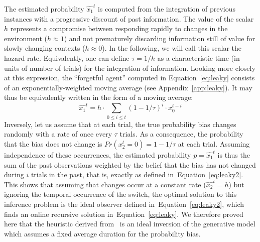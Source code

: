 \documentclass[12pt,english]{article}%
\newcommand{\eql}[1]{\begin{equation}#1\end{equation}}
\newcommand{\citet}[1]{\textcite{#1}}
\newcommand{\seeEq}[1]{Equation~\ref{eq:#1}}
\newcommand{\seeApp}[1]{Appendix~\ref{app:#1}}
\newcommand{\LP}[1]{\textbf{\textcolor{red}{[LP: #1]}}}
\newcommand{\AM}[1]{\textbf{\textcolor{blue}{[AM: #1]}}}
\begin{document}
The estimated probability $\hat{x_1}^{t}$ is computed
from the integration of previous instances
with a progressive discount of past information.
The value of the scalar $h$ represents
a compromise between responding rapidly
to changes in the environment ($h \approx 1$) and
not prematurely discarding information still of value
for slowly changing contexts  ($h \approx 0$).
In the following, we will call this scalar the hazard rate.
Equivalently, one can define $\tau = 1 / h$ as
a characteristic time (in units of number of trials)
for the integration of information.
Looking more closely at this expression,
the ``forgetful agent'' computed in \seeEq{leaky}
consists of an exponentially-weighted moving average (see \seeApp{leaky}).
It may thus be equivalently written in the form of a moving average:
\eql{
\hat{x_1}^{t} = h \cdot \sum_{0\leq i \leq t} (1 - 1/\tau)^{i} \cdot x_0^{t-i}
\label{eq:leaky2}}
Inversely, let us assume that at each trial,
the true probability bias changes randomly with a rate of once
every $\tau$ trials.
As a consequence, the probability that the bias does not change is $Pr(x_2^t=0)=1-1/\tau$ at each trial.
Assuming independence of these occurrences, the estimated probability $p=\hat{x_1}^{t}$ is thus the sum
of the past observations weighted by the belief that the bias has not changed during $i$ trials in the past, that is, exactly as defined in~\seeEq{leaky2}.
This shows that
assuming that changes occur at a constant rate ($\hat{x_2}^t=h$)
but ignoring the temporal occurrence of the switch,
the optimal solution to this inference problem is the
ideal observer defined in~\seeEq{leaky2},
which finds an online recursive solution in~\seeEq{leaky}.
We therefore proved here that the heuristic derived from~\citet{Anderson2006}
is an ideal inversion of the generative model
which assumes a fixed average duration for the probability bias.
\end{document}
